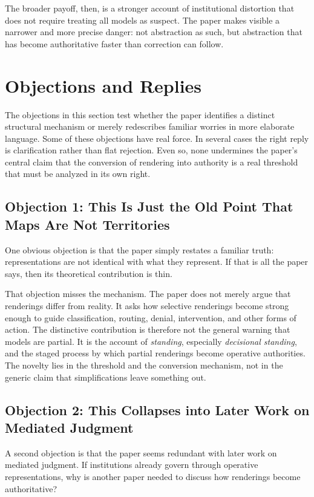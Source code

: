 \documentclass[11pt]{article}
\renewcommand{\emph}[1]{\textit{#1}}
\begin{document}
The broader payoff, then, is a stronger account of institutional distortion that does not require treating all models as suspect. The paper makes visible a narrower and more precise danger: not abstraction as such, but abstraction that has become authoritative faster than correction can follow.

\section{Objections and Replies}

The objections in this section test whether the paper identifies a distinct structural mechanism or merely redescribes familiar worries in more elaborate language. Some of these objections have real force. In several cases the right reply is clarification rather than flat rejection. Even so, none undermines the paper's central claim that the conversion of rendering into authority is a real threshold that must be analyzed in its own right.

\subsection{Objection 1: This Is Just the Old Point That Maps Are Not Territories}

One obvious objection is that the paper simply restates a familiar truth: representations are not identical with what they represent. If that is all the paper says, then its theoretical contribution is thin.\cite{FriggNguyen2020ModellingNature}

That objection misses the mechanism. The paper does not merely argue that renderings differ from reality. It asks how selective renderings become strong enough to guide classification, routing, denial, intervention, and other forms of action. The distinctive contribution is therefore not the general warning that models are partial. It is the account of \emph{standing}, especially \emph{decisional standing}, and the staged process by which partial renderings become operative authorities. The novelty lies in the threshold and the conversion mechanism, not in the generic claim that simplifications leave something out.

\subsection{Objection 2: This Collapses into Later Work on Mediated Judgment}

A second objection is that the paper seems redundant with later work on mediated judgment. If institutions already govern through operative representations, why is another paper needed to discuss how renderings become authoritative?\cite{Swanson2026MediatedJudgmentConstraint}
\end{document}
